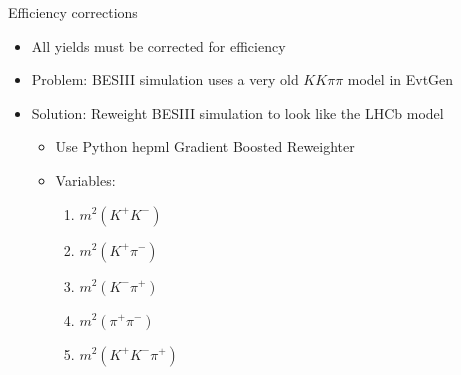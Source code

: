\documentclass{beamer}
\begin{document}
\begin{frame}{Efficiency corrections}
  \begin{itemize}
    \setlength\itemsep{1.5em}
    \item{All yields must be corrected for efficiency}
    \item{Problem: BESIII simulation uses a very old $KK\pi\pi$ model in EvtGen}
    \item{Solution: Reweight BESIII simulation to look like the LHCb model}
    \begin{itemize}
      \setlength\itemsep{0.5em}
      \item{Use Python hep\textunderscore ml Gradient Boosted Reweighter}
      \item{Variables:}
      \begin{enumerate}
        \item{$m^2(K^+K^-)$}
        \item{$m^2(K^+\pi^-)$}
        \item{$m^2(K^-\pi^+)$}
        \item{$m^2(\pi^+\pi^-)$}
        \item{$m^2(K^+K^-\pi^+)$}
      \end{enumerate}
    \end{itemize}
  \end{itemize}
\end{frame}
\end{document}

